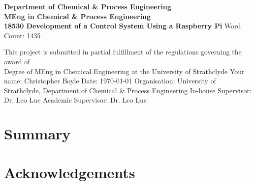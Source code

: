\documentclass[a4]{report}
\def\atitle{Development of a Control System Using a Raspberry Pi}
\def\thewords{1435}
\begin{document}
	\begin{titlepage}
		\centering
		\vskip4cm
		{
			\bfseries\Large
			Department of Chemical \& Process Engineering\\
			\vskip1cm
			MEng in Chemical \& Process Engineering\\
			18530
			\vskip3cm
			\LARGE\atitle
		}
		\vskip3cm
		{\small Word Count: \thewords}
		\vskip1cm
		\begin{flushleft}
			This project is submitted in partial fulfillment of the regulations governing the award of \\
			Degree of MEng in Chemical Engineering at the University of Strathclyde
			\vskip2cm
			Your name: Christopher Boyle \hfill Date: \today
			\vskip1cm
			Organisation: University of Strathclyde, Department of Chemical \& Process Engineering\newline%
			In-house Supervisor: Dr. Leo Lue \newline%
			Academic Supervisor: Dr. Leo Lue
		\end{flushleft}
	\end{titlepage}

	
	\chapter*{Summary}
	
	\tableofcontents
	
	\chapter*{Acknowledgements}
	
\end{document}
